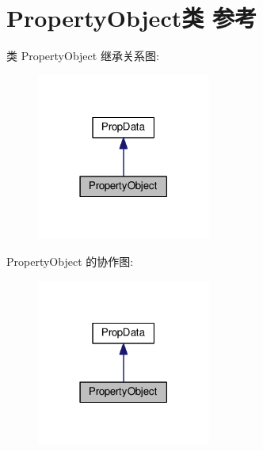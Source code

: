 \hypertarget{class_property_object}{\section{Property\+Object类 参考}
\label{class_property_object}
}


类 Property\+Object 继承关系图\+:
\nopagebreak
\begin{figure}[H]
\begin{center}
\leavevmode
\includegraphics[width=162pt]{class_property_object__inherit__graph}
\end{center}
\end{figure}


Property\+Object 的协作图\+:
\nopagebreak
\begin{figure}[H]
\begin{center}
\leavevmode
\includegraphics[width=162pt]{class_property_object__coll__graph}
\end{center}
\end{figure}
